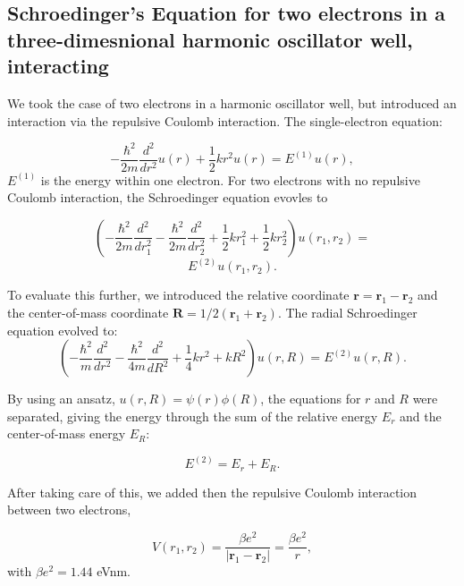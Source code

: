 \documentclass[10pt,showpacs,preprintnumbers,footinbib,amsmath,amssymb,aps,prl,twocolumn,groupedaddress,superscriptaddress,showkeys]{revtex4-1}
\begin{document}
	\subsection{Schroedinger's Equation for two electrons in a three-dimesnional harmonic oscillator well, interacting}	
We took the case of two electrons in a harmonic oscillator well, but
introduced an interaction via the repulsive Coulomb interaction.
The single-electron equation:

\begin{equation*}
-\frac{\hbar^2}{2 m} \frac{d^2}{dr^2} u(r) 
+ \frac{1}{2}k r^2u(r)  = E^{(1)} u(r),
\end{equation*}
$E^{(1)}$ is the energy within one electron.
For two electrons with no repulsive Coulomb interaction, the
Schroedinger equation evovles to

\begin{equation*}
\left(  -\frac{\hbar^2}{2 m} \frac{d^2}{dr_1^2} -\frac{\hbar^2}{2 m} \frac{d^2}{dr_2^2}+ \frac{1}{2}k r_1^2+ \frac{1}{2}k r_2^2\right)u(r_1,r_2)  =
\end{equation*}
\begin{equation*}
E^{(2)} u(r_1,r_2) .
\end{equation*}

To evaluate this further, we introduced the relative coordinate $\mathbf{r} = \mathbf{r}_1-\mathbf{r}_2$
and the center-of-mass coordinate $\mathbf{R} = 1/2(\mathbf{r}_1+\mathbf{r}_2)$.
The radial Schroedinger equation evolved to:
\begin{equation*}
\left(  -\frac{\hbar^2}{m} \frac{d^2}{dr^2} -\frac{\hbar^2}{4 m} \frac{d^2}{dR^2}+ \frac{1}{4} k r^2+  kR^2\right)u(r,R)  = E^{(2)} u(r,R).
\end{equation*}

By using an ansatz, $u(r,R) = \psi(r)\phi(R)$, the equations for $r$ and $R$ were separated, giving the energy through the sum
of the relative energy $E_r$ and the center-of-mass energy $E_R$:

\begin{equation*}
E^{(2)}=E_r+E_R.
\end{equation*}

After taking care of this, we added then the repulsive Coulomb interaction between two electrons,

\begin{equation*}
V(r_1,r_2) = \frac{\beta e^2}{|\mathbf{r}_1-\mathbf{r}_2|}=\frac{\beta e^2}{r},
\end{equation*}
with $\beta e^2=1.44$ eVnm.
\end{document}
